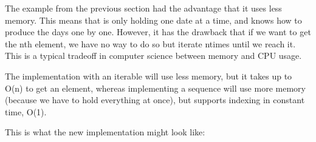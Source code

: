 \documentclass[a4paper,10pt,english]{sphinxmanual}
\begin{document}
The example from the previous section had the advantage that it uses less memory. This means that is only holding one
date at a time, and knows how to produce the days one by one. However, it has the drawback that if we want to get the
n\sphinxhyphen{}th element, we have no way to do so but iterate n\sphinxhyphen{}times until we reach it. This is a typical trade\sphinxhyphen{}off in computer
science between memory and CPU usage.

The implementation with an iterable will use less memory, but it takes up to O(n) to get an element, whereas
implementing a sequence will use more memory (because we have to hold everything at once), but supports indexing in
constant time, O(1).

This is what the new implementation might look like:

\begin{sphinxVerbatim}[commandchars=\\\{\}]
 
        
           
           
           

      
           \PYG{p}{[}\PYG{p}{]}
           

            
               

          

       
         \PYG{p}{[}\PYG{p}{]}

      
         
\end{sphinxVerbatim}
\end{document}
